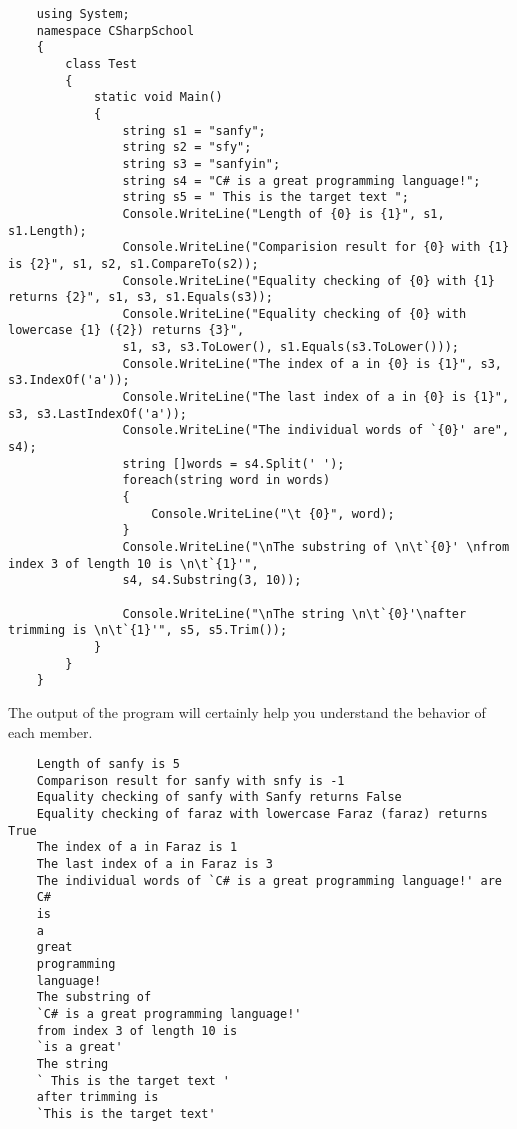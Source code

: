 \begin{lstlisting}
    using System;
    namespace CSharpSchool
    {
        class Test
        {
            static void Main()
            {
                string s1 = "sanfy";
                string s2 = "sfy";
                string s3 = "sanfyin";
                string s4 = "C# is a great programming language!";
                string s5 = " This is the target text ";
                Console.WriteLine("Length of {0} is {1}", s1, s1.Length);
                Console.WriteLine("Comparision result for {0} with {1} is {2}", s1, s2, s1.CompareTo(s2));
                Console.WriteLine("Equality checking of {0} with {1} returns {2}", s1, s3, s1.Equals(s3));
                Console.WriteLine("Equality checking of {0} with lowercase {1} ({2}) returns {3}",
                s1, s3, s3.ToLower(), s1.Equals(s3.ToLower()));
                Console.WriteLine("The index of a in {0} is {1}", s3, s3.IndexOf('a'));
                Console.WriteLine("The last index of a in {0} is {1}", s3, s3.LastIndexOf('a'));
                Console.WriteLine("The individual words of `{0}' are", s4);
                string []words = s4.Split(' ');
                foreach(string word in words)
                {
                    Console.WriteLine("\t {0}", word);
                }
                Console.WriteLine("\nThe substring of \n\t`{0}' \nfrom index 3 of length 10 is \n\t`{1}'",
                s4, s4.Substring(3, 10));
                
                Console.WriteLine("\nThe string \n\t`{0}'\nafter trimming is \n\t`{1}'", s5, s5.Trim());
            }
        }
    }    
\end{lstlisting}

The output of the program will certainly help you understand the behavior of each member.


\begin{lstlisting}
    Length of sanfy is 5
    Comparison result for sanfy with snfy is -1
    Equality checking of sanfy with Sanfy returns False
    Equality checking of faraz with lowercase Faraz (faraz) returns True
    The index of a in Faraz is 1
    The last index of a in Faraz is 3
    The individual words of `C# is a great programming language!' are
    C#
    is
    a
    great
    programming
    language!
    The substring of
    `C# is a great programming language!'
    from index 3 of length 10 is
    `is a great'
    The string
    ` This is the target text '
    after trimming is
    `This is the target text'       
\end{lstlisting}

